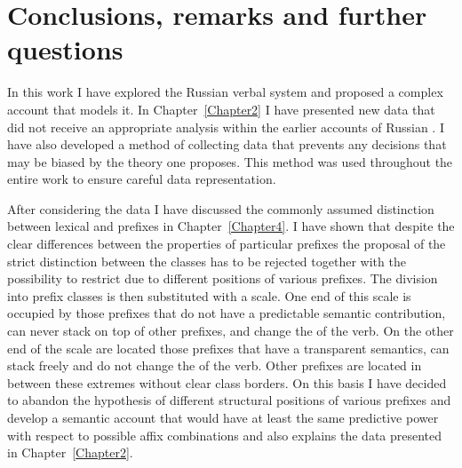 
\chapter{Conclusions, remarks and further questions} %
\label{Chapter9}

In this work I have explored the Russian verbal  system and proposed a complex account that models it. In Chapter~\ref{Chapter2} I have presented new data that did not receive an appropriate analysis within the earlier accounts of Russian . I have also developed a method of collecting data that prevents any decisions that may be biased by the theory one proposes. This method was used throughout the entire work to ensure careful data representation.

After considering the data I have discussed the commonly assumed distinction between lexical and  prefixes in Chapter~\ref{Chapter4}. I have shown that despite the clear differences between the properties of particular prefixes the proposal of the strict distinction between the classes has to be rejected together with the possibility to restrict  due to different positions of various prefixes. The division into prefix classes is then substituted with a scale. One end of this scale is occupied by those prefixes that do not have a predictable semantic contribution, can never stack on top of other prefixes, and change the  of the verb. On the other end of the scale are located those prefixes that have a transparent semantics, can stack freely and do not change the  of the verb. Other prefixes are located in between these extremes without clear class borders. On this basis I have decided to abandon the hypothesis of different structural positions of various prefixes and develop a semantic account that would have at least the same predictive power with respect to possible affix combinations and also explains the data presented in Chapter~\ref{Chapter2}.

